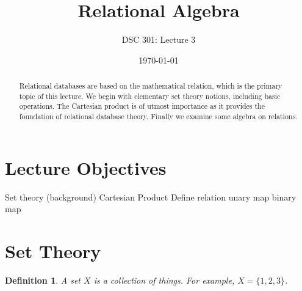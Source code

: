 \documentclass{article}
\newtheorem{definition}{Definition}
\begin{document}
\title{Relational Algebra}
\author{DSC 301: Lecture 3}
\date{\today}
\maketitle

\begin{abstract}
   Relational databases are based on the mathematical relation, which is
the primary topic of this lecture.  We begin with elementary set
theory notions, including basic operations. The Cartesian product is of utmost importance as it provides the foundation of relational database theory.  Finally we examine some algebra on relations.        
\end{abstract}


\begin{outline}[enumerate]

\end{outline}
\begin{outline}
        
\end{outline}




\section{Lecture Objectives}
\begin{outline}
        \1  Set theory (background)
                \2  Cartesian Product
        \1  Define relation
        \1  unary map
        \1  binary map
        

\end{outline}









\section{Set Theory }
 
 \begin{definition}
 A set $X$ is a collection of things. For example, $X = \{1,2,3\}$.  
 \end{definition}
 
\end{document}

